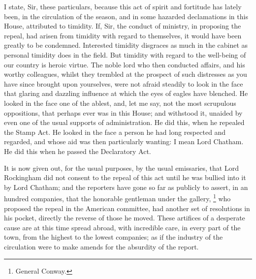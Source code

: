 I state, Sir, these particulars, because this act of spirit and fortitude has lately been, in the circulation of the season, and in some hazarded declamations in this House, attributed to timidity. If, Sir, the conduct of ministry, in proposing the repeal, had arisen from timidity with regard to themselves, it would have been greatly to be condemned. Interested timidity disgraces as much in the cabinet as personal timidity does in the field. But timidity with regard to the well-being of our country is heroic virtue. The noble lord who then conducted affairs, and his worthy colleagues, whilst they trembled at the prospect of such distresses as you have since brought upon yourselves, were not afraid steadily to look in the face that glaring and dazzling influence at which the eyes of eagles have blenched. He looked in the face one of the ablest, and, let me say, not the most scrupulous oppositions, that perhaps ever was in this House; and withstood it, unaided by even one of the usual supports of administration. He did this, when he repealed the Stamp Act. He looked in the face a person he had long respected and regarded, and whose aid was then particularly wanting: I mean Lord Chatham. He did this when he passed the Declaratory Act.

It is now given out, for the usual purposes, by the usual emissaries, that Lord Rockingham did not consent to the repeal of this act until he was bullied into it by Lord Chatham; and the reporters have gone so far as publicly to assert, in an hundred companies, that the honorable gentleman under the gallery,
\footnote{General Conway.}
who proposed the repeal in the American committee, had another set of resolutions in his pocket, directly the reverse of those he moved. These artifices of a desperate cause are at this time spread abroad, with incredible care, in every part of the town, from the highest to the lowest companies; as if the industry of the circulation were to make amends for the absurdity of the report.

